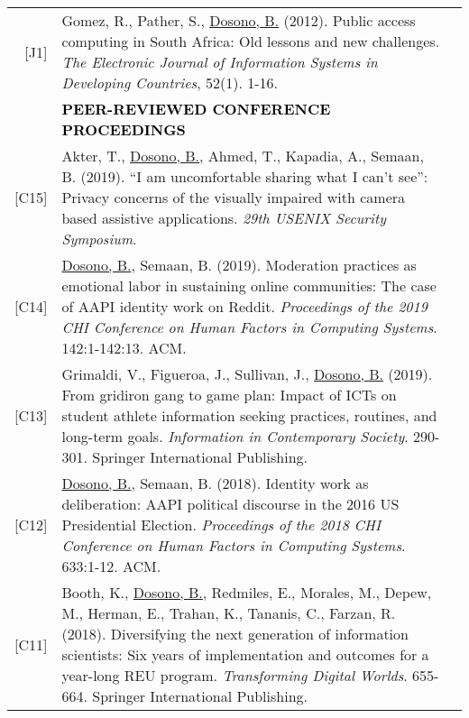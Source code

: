 \documentclass[11pt]{article}
\begin{document}
{{\begin{longtable}{Rp{0.75in}p{5.0in}}
\footnotesize{[J1]} & Gomez, R., Pather, S., \href{https://doi.org/10.1002/j.1681-4835.2012.tb00366.x}{{Dosono, B.}} (2012). Public access computing in South Africa: Old lessons and new challenges. \textit{The Electronic Journal of Information Systems in Developing Countries}, 52(1). 1-16.\\

& \textcolor{black}{\uppercase{\textbf{Peer-reviewed Conference Proceedings}}}\\

\footnotesize{[C15]} & Akter, T., \href{https://www.usenix.org/conference/usenixsecurity20/presentation/akter}{{Dosono, B.}}, Ahmed, T., Kapadia, A., Semaan, B. (2019). ``I am uncomfortable sharing what I can't see'': Privacy concerns of the visually impaired with camera based assistive applications. \textit{29th {USENIX} Security Symposium}.\\

\footnotesize{[C14]} & \href{https://dl.acm.org/authorize?N680367}{{Dosono, B.}}, Semaan, B. (2019). Moderation practices as emotional labor in sustaining online communities: The case of AAPI identity work on Reddit. \textit{Proceedings of the 2019 CHI Conference on Human Factors in Computing Systems}. 142:1-142:13. ACM.\\

\footnotesize{[C13]} & Grimaldi, V., Figueroa, J., Sullivan, J., \href{https://doi.org/10.1007/978-3-030-15742-5_29}{{Dosono, B.}} (2019). From gridiron gang to game plan: Impact of ICTs on student athlete information seeking practices, routines, and long-term goals. \textit{Information in Contemporary Society}. 290-301. Springer International Publishing.\\

\footnotesize{[C12]} & \href{https://dl.acm.org/authorize?N658208}{{Dosono, B.}}, Semaan, B. (2018). Identity work as deliberation: AAPI political discourse in the 2016 US Presidential Election. \textit{Proceedings of the 2018 CHI Conference on Human Factors in Computing Systems}. 633:1-12. ACM.\\

\footnotesize{[C11]} & Booth, K., \href{https://doi.org/10.1007/978-3-319-78105-1_75}{{Dosono, B.}}, Redmiles, E., Morales, M., Depew, M., Herman, E., Trahan, K., Tananis, C., Farzan, R. (2018). Diversifying the next generation of information scientists: Six years of implementation and outcomes for a year-long REU program. \textit{Transforming Digital Worlds}. 655-664. Springer International Publishing.\\


\end{longtable}}}
\end{document}

